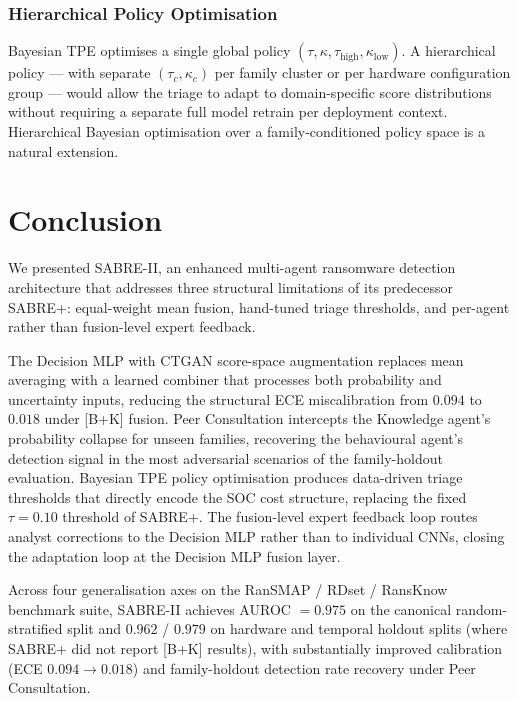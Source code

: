 \documentclass[journal]{IEEEtran}
\newcommand{\tauh}{\tau_{\mathrm{high}}}
\newcommand{\klow}{\kappa_{\mathrm{low}}}
\begin{document}
\subsubsection{Hierarchical Policy Optimisation}

Bayesian TPE optimises a single global policy $(\tau, \kappa, \tauh, \klow)$.
A hierarchical policy --- with separate $(\tau_c, \kappa_c)$ per family
cluster or per hardware configuration group --- would allow the triage
to adapt to domain-specific score distributions without requiring a
separate full model retrain per deployment context.
Hierarchical Bayesian optimisation over a family-conditioned policy
space is a natural extension.


\section{Conclusion}
\label{sec:conclusion}

We presented SABRE-II, an enhanced multi-agent ransomware detection
architecture that addresses three structural limitations of its predecessor
SABRE+: equal-weight mean fusion, hand-tuned triage thresholds, and
per-agent rather than fusion-level expert feedback.

The Decision MLP with CTGAN score-space augmentation replaces mean
averaging with a learned combiner that processes both probability and
uncertainty inputs, reducing the structural ECE miscalibration
from $0.094$ to $\mathbf{0.018}$ under [B+K] fusion.
Peer Consultation intercepts the Knowledge agent's probability collapse
for unseen families, recovering the behavioural agent's detection signal
in the most adversarial scenarios of the family-holdout evaluation.
Bayesian TPE policy optimisation produces data-driven triage thresholds
that directly encode the SOC cost structure, replacing the fixed
$\tau = 0.10$ threshold of SABRE+.
The fusion-level expert feedback loop routes analyst corrections to
the Decision MLP rather than to individual CNNs, closing the adaptation
loop at the Decision MLP fusion layer.

Across four generalisation axes on the
RanSMAP / RDset / RansKnow benchmark suite, SABRE-II achieves AUROC
$= \mathbf{0.975}$ on the canonical random-stratified split and
$\mathbf{0.962}$ / $\mathbf{0.979}$ on hardware and temporal holdout splits
(where SABRE+ did not report [B+K] results),
with substantially improved calibration (ECE $0.094 \to 0.018$) and
family-holdout detection rate recovery under Peer Consultation.
\end{document}
